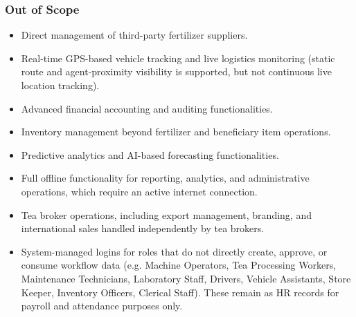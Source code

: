 \subsubsection{Out of Scope}
\begin{itemize}
    \item Direct management of third-party fertilizer suppliers.
    \item Real-time GPS-based vehicle tracking and live logistics monitoring (static route and agent-proximity visibility is supported, but not continuous live location tracking).
    \item Advanced financial accounting and auditing functionalities.
    \item Inventory management beyond fertilizer and beneficiary item operations.
    \item Predictive analytics and AI-based forecasting functionalities.
    \item Full offline functionality for reporting, analytics, and administrative operations, which require an active internet connection.
    \item Tea broker operations, including export management, branding, and international sales handled independently by tea brokers.
    \item System-managed logins for roles that do not directly create, approve, or consume workflow data (e.g. Machine Operators, Tea Processing Workers, Maintenance Technicians, Laboratory Staff, Drivers, Vehicle Assistants, Store Keeper, Inventory Officers, Clerical Staff). These remain as HR records for payroll and attendance purposes only. 
\end{itemize}

